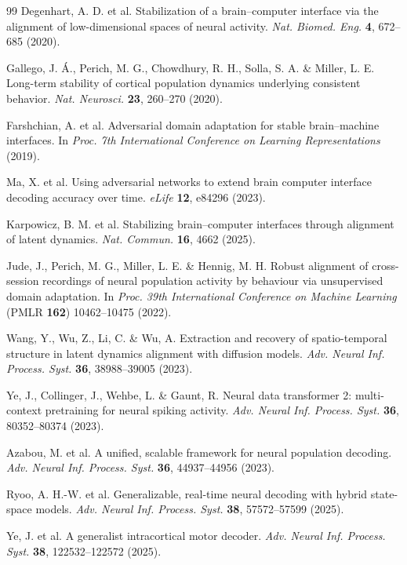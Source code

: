 \begin{thebibliography}{99}
 Degenhart, A. D. et al. Stabilization of a brain--computer interface via the alignment of low-dimensional spaces of neural activity. \textit{Nat. Biomed. Eng.} \textbf{4}, 672--685 (2020).

 Gallego, J. {\'A}., Perich, M. G., Chowdhury, R. H., Solla, S. A. \& Miller, L. E. Long-term stability of cortical population dynamics underlying consistent behavior. \textit{Nat. Neurosci.} \textbf{23}, 260--270 (2020).

 Farshchian, A. et al. Adversarial domain adaptation for stable brain--machine interfaces. In \textit{Proc. 7th International Conference on Learning Representations} (2019).

 Ma, X. et al. Using adversarial networks to extend brain computer interface decoding accuracy over time. \textit{eLife} \textbf{12}, e84296 (2023).

 Karpowicz, B. M. et al. Stabilizing brain--computer interfaces through alignment of latent dynamics. \textit{Nat. Commun.} \textbf{16}, 4662 (2025).

 Jude, J., Perich, M. G., Miller, L. E. \& Hennig, M. H. Robust alignment of cross-session recordings of neural population activity by behaviour via unsupervised domain adaptation. In \textit{Proc. 39th International Conference on Machine Learning} (PMLR \textbf{162}) 10462--10475 (2022).

 Wang, Y., Wu, Z., Li, C. \& Wu, A. Extraction and recovery of spatio-temporal structure in latent dynamics alignment with diffusion models. \textit{Adv. Neural Inf. Process. Syst.} \textbf{36}, 38988--39005 (2023).

 Ye, J., Collinger, J., Wehbe, L. \& Gaunt, R. Neural data transformer 2: multi-context pretraining for neural spiking activity. \textit{Adv. Neural Inf. Process. Syst.} \textbf{36}, 80352--80374 (2023).

 Azabou, M. et al. A unified, scalable framework for neural population decoding. \textit{Adv. Neural Inf. Process. Syst.} \textbf{36}, 44937--44956 (2023).

 Ryoo, A. H.-W. et al. Generalizable, real-time neural decoding with hybrid state-space models. \textit{Adv. Neural Inf. Process. Syst.} \textbf{38}, 57572--57599 (2025).

 Ye, J. et al. A generalist intracortical motor decoder. \textit{Adv. Neural Inf. Process. Syst.} \textbf{38}, 122532--122572 (2025).


\end{thebibliography}
